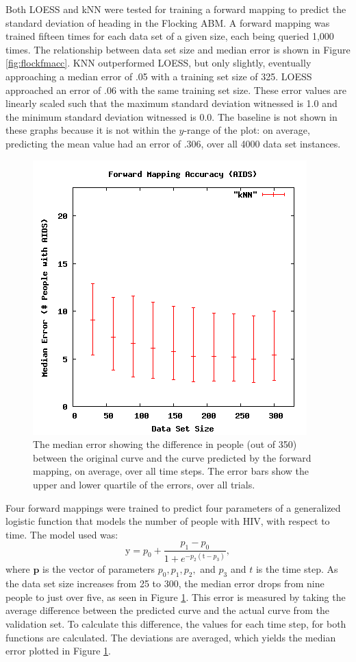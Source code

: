 Both LOESS and kNN were tested for training a forward mapping to predict the standard deviation of heading in the Flocking ABM.
A forward mapping was trained fifteen times for each data set of a given size, each being queried 1,000 times.
The relationship between data set size and median error is shown in Figure \ref{fig:flockfmacc}. 
KNN outperformed LOESS, but only slightly, eventually approaching a median error of .05 with a training set size of 325.
LOESS approached an error of .06 with the same training set size.
These error values are linearly scaled such that the maximum standard deviation witnessed is 1.0 and the minimum standard deviation witnessed is 0.0.
The baseline is not shown in these graphs because it is not within the $y$-range of the plot: on average, predicting the mean value had an error of .306, over all 4000 data set instances.


\begin{figure}[ht]
\centering
\includegraphics[scale=.5]{images/results_aids/aids-fmacc.png}
\caption{The median error showing the difference in people  (out of 350) between the original curve and the curve predicted by the forward mapping, on average, over all time steps.
The error bars show the upper and lower quartile of the errors, over all trials.}
\label{fig:aidsfmacc}
\end{figure}

Four forward mappings were trained to predict four parameters of a generalized logistic function that models the number of people with HIV, with respect to time.
The model used was:
\[ \mathrm{y} = p_0 + \displaystyle \frac{p_1 - p_0}{1 + e ^ {-p_2  (\mathrm{t} - p_3) } }, \]
where $\mathbf p$ is the vector of parameters $p_0, p_1, p_2,$ and $p_3$ and $t$ is the time step.
As the data set size increases from 25 to 300, the median error drops from nine people to just over five, as seen in Figure \ref{fig:aidsfmacc}.
This error is measured by taking the average difference between the predicted curve and the actual curve from the validation set.
To calculate this difference, the values for each time step, for both functions are calculated.
The deviations are averaged, which yields the median error plotted in Figure \ref{fig:aidsfmacc}.

